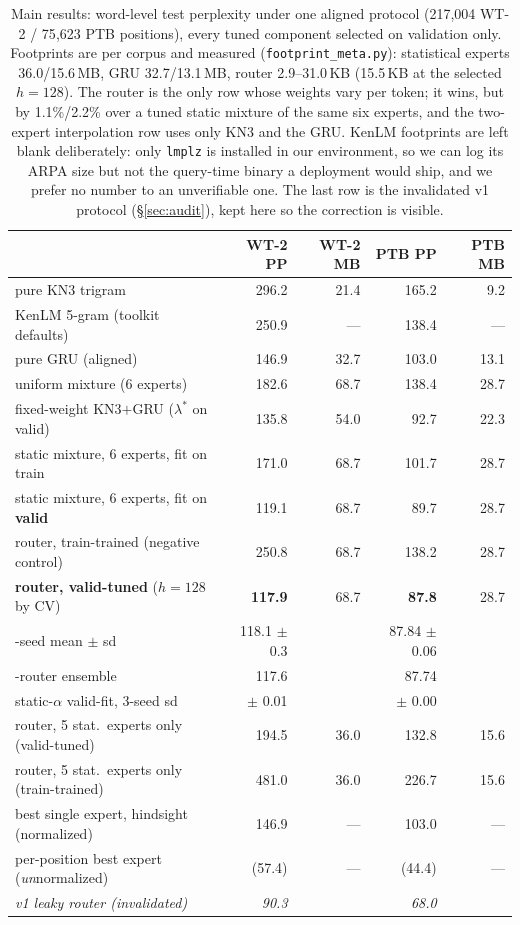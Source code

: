 \documentclass[11pt]{article}
\begin{document}
\begin{table}[t]
\centering\footnotesize
\setlength{\tabcolsep}{5pt}
\begin{tabular}{lrrrr}
\toprule
 & WT-2 PP & WT-2 MB & PTB PP & PTB MB \\
\midrule
pure KN3 trigram & 296.2 & 21.4 & 165.2 & 9.2 \\
KenLM 5-gram (toolkit defaults) & 250.9 & --- & 138.4 & --- \\
pure GRU (aligned) & 146.9 & 32.7 & 103.0 & 13.1 \\
uniform mixture (6 experts) & 182.6 & 68.7 & 138.4 & 28.7 \\
fixed-weight KN3$+$GRU ($\lambda^{*}$ on valid) & 135.8 & 54.0 & 92.7 & 22.3 \\
static mixture, 6 experts, fit on train & 171.0 & 68.7 & 101.7 & 28.7 \\
static mixture, 6 experts, fit on \textbf{valid} & 119.1 & 68.7 & 89.7 & 28.7 \\
\midrule
router, train-trained (negative control) & 250.8 & 68.7 & 138.2 & 28.7 \\
\textbf{router, valid-tuned} ($h{=}128$ by CV) & \textbf{117.9} & 68.7 & \textbf{87.8} & 28.7 \\
\quad 3-seed mean $\pm$ sd & 118.1 $\pm$ 0.3 & & 87.84 $\pm$ 0.06 & \\
\quad 3-router ensemble & 117.6 & & 87.74 & \\
\quad static-$\alpha$ valid-fit, 3-seed sd & $\pm$ 0.01 & & $\pm$ 0.00 & \\
router, 5 stat.\ experts only (valid-tuned) & 194.5 & 36.0 & 132.8 & 15.6 \\
router, 5 stat.\ experts only (train-trained) & 481.0 & 36.0 & 226.7 & 15.6 \\
\midrule
best single expert, hindsight (normalized) & 146.9 & --- & 103.0 & --- \\
per-position best expert (\emph{un}normalized) & (57.4) & --- & (44.4) & --- \\
\midrule
\emph{v1 leaky router (invalidated)} & \emph{90.3} & & \emph{68.0} & \\
\bottomrule
\end{tabular}
\caption{Main results: word-level test perplexity under one aligned protocol
(217{,}004 WT-2 / 75{,}623 PTB positions), every tuned component selected on
validation only. Footprints are per corpus and measured
(\texttt{footprint\_meta.py}): statistical experts 36.0/15.6\,MB,
GRU 32.7/13.1\,MB, router 2.9--31.0\,KB (15.5\,KB at the selected $h=128$).
The router is the only row whose weights vary per token; it wins, but by
1.1\%/2.2\% over a tuned static mixture of the same six experts, and the
two-expert interpolation row uses only KN3 and the GRU. KenLM footprints are
left blank deliberately: only \texttt{lmplz} is installed in our environment,
so we can log its ARPA size but not the query-time binary a deployment would
ship, and we prefer no number to an unverifiable one. The last row is the invalidated v1 protocol
(\S\ref{sec:audit}), kept here so the correction is visible.}
\label{tab:money}
\end{table}
\end{document}
